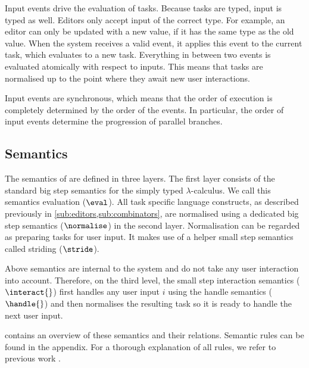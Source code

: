 Input events drive the evaluation of tasks.
Because tasks are typed, input is typed as well.
Editors only accept input of the correct type.
For example, an editor can only be updated with a new value, if it has the same type as the old value.
When the system receives a valid event, it applies this event to the current task, which evaluates to a new task.
Everything in between two events is evaluated atomically with respect to inputs.
This means that tasks are normalised up to the point where they await new user interactions.

Input events are synchronous, which means that the order of execution is completely determined by the order of the events.
In particular, the order of input events determine the progression of parallel branches.


\subsection{Semantics}

The semantics of \TOPHAT are defined in three layers.
The first layer consists of the standard big step semantics for the simply typed $\lambda$-calculus.
We call this semantics evaluation ($\eval$).
All task specific language constructs, as described previously in \cref{sub:editors,sub:combinators},
are normalised using a dedicated big step semantics ($\normalise$) in the second layer.
Normalisation can be regarded as preparing tasks for user input.
It makes use of a helper small step semantics called striding ($\stride$).

Above semantics are internal to the system and do not take any user interaction into account.
Therefore, on the third level, the small step interaction semantics ($\interact{}$) first handles any user input $i$ using the handle semantics ($\handle{}$)
and then normalises the resulting task so it is ready to handle the next user input.

 contains an overview of these semantics and their relations.
Semantic rules can be found in the appendix.
For a thorough explanation of all rules, we refer to previous work \cite{DBLP:conf/ppdp/SteenvoordenNK19}.

